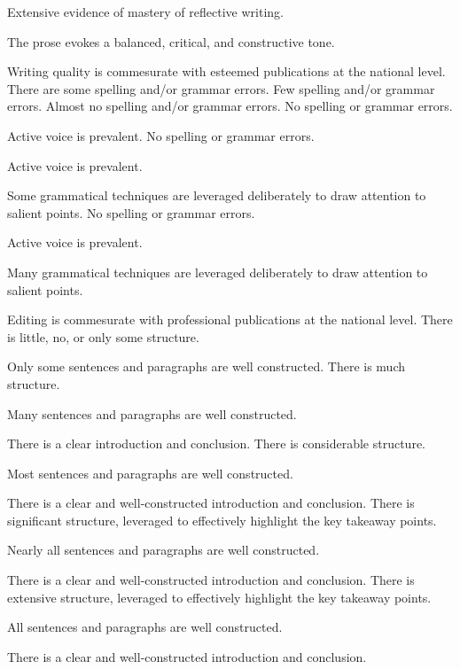 \documentclass{../../fal_assignment}
\begin{document}
\begin{markingrubric}
        \grade 		Extensive evidence of mastery of reflective writing.
         \par 		The prose evokes a balanced, critical, and constructive tone.
	\par 		Writing quality is commesurate with esteemed publications at the national level.
%
        \grade \fail		There are some spelling and/or grammar errors.  
        \grade 		Few spelling and/or grammar errors.
        \grade 		Almost no spelling and/or grammar errors.
        \grade 		No spelling or grammar errors.
        \par 		Active voice is prevalent.
        \grade 		No spelling or grammar errors.
        \par 		Active voice is prevalent.
        \par 		Some grammatical techniques are leveraged deliberately to draw attention to salient points.     
        \grade 		No spelling or grammar errors.
        \par 		Active voice is prevalent.
        \par 		Many grammatical techniques are leveraged deliberately to draw attention to salient points.
	\par 		Editing is commesurate with professional publications at the national level.   
%
        \grade\fail 		There is little, no, or only some structure.
        \par 		Only some sentences and paragraphs are well constructed.
        \grade 		There is much structure.
        \par 		Many sentences and paragraphs are well constructed.
        \par 		There is a clear introduction and conclusion.
        \grade 		There is considerable structure.
        \par 		Most sentences and paragraphs are well constructed.
        \par 		There is a clear and well-constructed introduction and conclusion.
        \grade 		There is significant structure, leveraged to effectively highlight the key takeaway points.
        \par 		Nearly all sentences and paragraphs are well constructed.
        \par 		There is a clear and well-constructed introduction and conclusion.
        \grade 		There is extensive structure, leveraged to effectively highlight the key takeaway points.
        \par 		All sentences and paragraphs are well constructed.
        \par 		There is a clear and well-constructed introduction and conclusion.


\end{markingrubric}
\end{document}
